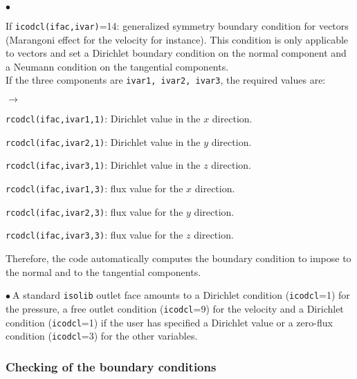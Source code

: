 {{{\begin{list}{$\bullet$}{}
\item If \texttt{icodcl(ifac,ivar)}=14: generalized symmetry boundary condition for vectors (Marangoni
      effect for the velocity for instance).
      This condition is only applicable to vectors and set a Dirichlet boundary condition on the normal
      component and a Neumann condition on the tangential components.\\
      If the three components are  \texttt{ivar1, ivar2, ivar3}, the required values are:

\begin{list}{$\rightarrow$}{}
      \item \texttt{rcodcl(ifac,ivar1,1)}: Dirichlet value in the $x$ direction.
      \item \texttt{rcodcl(ifac,ivar2,1)}: Dirichlet value in the $y$ direction.
      \item \texttt{rcodcl(ifac,ivar3,1)}: Dirichlet value in the $z$ direction.
      \item \texttt{rcodcl(ifac,ivar1,3)}: flux value for the $x$ direction.
      \item \texttt{rcodcl(ifac,ivar2,3)}: flux value for the $y$ direction.
      \item \texttt{rcodcl(ifac,ivar3,3)}: flux value for the $z$ direction.
\end{list}
      Therefore, the code automatically computes the boundary condition to impose to the normal and to
      the tangential components.

\end{list}

$\bullet\ $A standard \texttt{isolib} outlet face amounts to a Dirichlet
condition (\texttt{icodcl}=1) for the pressure, a free outlet condition
(\texttt{icodcl}=9) for the velocity and a Dirichlet condition
(\texttt{icodcl}=1) if the user has specified a Dirichlet value or a zero-flux
condition (\texttt{icodcl}=3) for the other variables.\\

\subsubsection{Checking of the boundary conditions}

}}}
